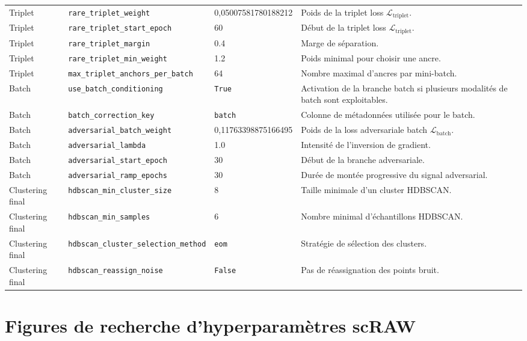 {\begin{longtable}{p{}p{}p{}p{}}
Triplet & \texttt{rare\_triplet\_weight} & 0,050075\allowbreak{}81780188212 & Poids de la triplet loss \(\mathcal{L}_{\mathrm{triplet}}\). \\
Triplet & \texttt{rare\_triplet\_start\_epoch} & 60 & Début de la triplet loss \(\mathcal{L}_{\mathrm{triplet}}\). \\
Triplet & \texttt{rare\_triplet\_margin} & 0.4 & Marge de séparation. \\
Triplet & \texttt{rare\_triplet\_min\_weight} & 1.2 & Poids minimal pour choisir une ancre. \\
Triplet & \texttt{max\_triplet\_anchors\_per\_batch} & 64 & Nombre maximal d'ancres par mini-batch. \\

Batch & \texttt{use\_batch\_conditioning} & \texttt{True} & Activation de la branche batch si plusieurs modalités de batch sont exploitables. \\
Batch & \texttt{batch\_correction\_key} & \texttt{batch} & Colonne de métadonnées utilisée pour le batch. \\
Batch & \texttt{adversarial\_batch\_weight} & 0,117633\allowbreak{}98875166495 & Poids de la loss adversariale batch \(\mathcal{L}_{\mathrm{batch}}\). \\
Batch & \texttt{adversarial\_lambda} & 1.0 & Intensité de l'inversion de gradient. \\
Batch & \texttt{adversarial\_start\_epoch} & 30 & Début de la branche adversariale. \\
Batch & \texttt{adversarial\_ramp\_epochs} & 30 & Durée de montée progressive du signal adversarial. \\

Clustering final & \texttt{hdbscan\_min\_cluster\_size} & 8 & Taille minimale d'un cluster HDBSCAN. \\
Clustering final & \texttt{hdbscan\_min\_samples} & 6 & Nombre minimal d'échantillons HDBSCAN. \\
Clustering final & \texttt{hdbscan\_cluster\_selection\_method} & \texttt{eom} & Stratégie de sélection des clusters. \\
Clustering final & \texttt{hdbscan\_reassign\_noise} & \texttt{False} & Pas de réassignation des points bruit. \\
\end{longtable}
}

\newpage
\section{Figures de recherche d'hyperparamètres scRAW}
\label{annexe:figures_hyperparametres_scraw}

